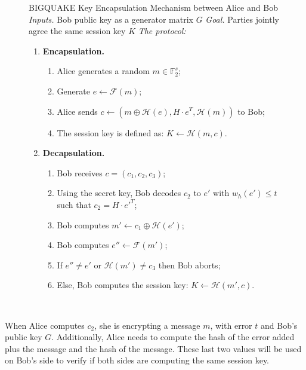 \begin{figure}[ht]
\centering
\begin{protocol}{BIGQUAKE Key Encapsulation Mechanism between Alice and Bob}
    \textit{Inputs.} Bob public key as a generator matrix $G$
    \sbline
    \textit{Goal.} Parties jointly agree the same session key $K$
    \sbline
    \textit{The protocol:}
    \begin{enumerate}
      \item \textbf{Encapsulation.}
      \begin{enumerate}[label=(\alph*)]
        \item Alice generates a random $m \in \mathbb{F}^s_2$;
    
        \item Generate $e \gets \mathcal{F}(m)$;
        
        \item Alice sends $c \gets (m\oplus\mathcal{H}(e), H\cdot e^T, \mathcal{H}(m))$ to Bob;
        
        \item The session key is defined as: $K\gets \mathcal{H}(m,c)$.
      \end{enumerate}
      \item \textbf{Decapsulation.}
      \begin{enumerate}[label=(\alph*)]
        \item Bob receives $c = (c_1,c_2,c_3)$;
        \item Using the secret key, Bob decodes $c_2$ to $e'$ with $w_h(e') \leq t$ such that $c_2 = H\cdot e'^T$;
        \item Bob computes $m' \gets c_1\oplus\mathcal{H}(e')$;
        \item Bob computes $e'' \gets \mathcal{F}(m')$;
        \item If $e'' \neq e'$ or $\mathcal{H}(m') \neq c_3$ then Bob aborts;
        \item Else, Bob computes the session key: $K\gets \mathcal{H}(m',c)$.
      \end{enumerate}
    \end{enumerate}
    \\
    \hline
\end{protocol}
\end{figure}
 
When Alice computes $c_2$, she is encrypting a message $m$, with error $t$ and Bob's public key $G$. Additionally, Alice needs to compute the hash of the error added plus the message and the hash of the message. These last two values will be used on Bob's side to verify if both sides are computing the same session key. 

